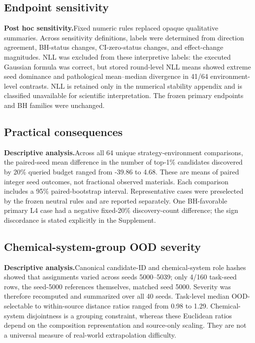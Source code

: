\documentclass[10pt]{article}
\newcommand{\evidencelabel}[1]{\textbf{#1}\enspace}
\begin{document}
\subsection{Endpoint sensitivity}
\evidencelabel{Post hoc sensitivity.}Fixed numeric rules replaced opaque
qualitative summaries. Across sensitivity definitions, labels were determined
from direction agreement, BH-status changes, CI-zero-status changes, and
effect-change magnitudes. NLL was excluded from these interpretive labels:
the executed Gaussian formula was correct, but stored round-level NLL means
showed extreme seed dominance and pathological mean--median divergence in
41/64 environment-level contrasts. NLL is retained only in the numerical
stability appendix and is classified unavailable for scientific interpretation.
The frozen primary endpoints and BH families were unchanged.

\subsection{Practical consequences}
\evidencelabel{Descriptive analysis.}Across all 64 unique
strategy-environment comparisons, the paired-seed mean difference in the
number of top-1\% candidates discovered by 20\% queried budget ranged from
-39.86 to
4.68. These are means of paired integer
seed outcomes, not fractional observed materials. Each comparison includes a
95\% paired-bootstrap interval. Representative cases were preselected by the
frozen neutral rules and are reported separately. One BH-favorable primary L4
case had a negative fixed-20\% discovery-count difference; the sign discordance
is stated explicitly in the Supplement.

\subsection{Chemical-system-group OOD severity}
\evidencelabel{Descriptive analysis.}Canonical candidate-ID and
chemical-system role hashes showed that assignments varied across seeds
5000--5039; only 4/160 task-seed rows, the seed-5000 references themselves,
matched seed 5000. Severity was therefore recomputed and summarized over all
40 seeds. Task-level median OOD-selectable to within-source distance ratios
ranged from 0.98 to
1.29. Chemical-system disjointness is
a grouping constraint, whereas these Euclidean ratios depend on the
composition representation and source-only scaling. They are not a universal
measure of real-world extrapolation difficulty.
\end{document}
